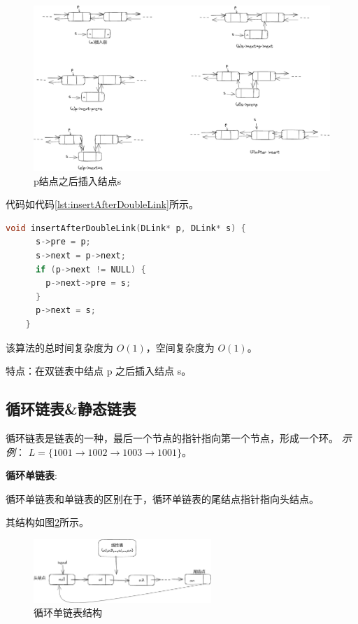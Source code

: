 \documentclass[lang=cn,newtx,10pt,scheme=chinese]{../elegantbook}
\begin{document}
  \begin{figure}[!htbp]
    \centering
    \includegraphics[width=1\textwidth]{./figure/pdf/cropped/insertDL.pdf}
    \caption{p结点之后插入结点s}
    \label{fig:insertAfterDoubleLink}
  \end{figure}
  代码如代码\ref{lst:insertAfterDoubleLink}所示。

  \begin{lstlisting}[language=C++, caption={p结点之后插入结点s示例代码}, label={lst:insertAfterDoubleLink}]
    void insertAfterDoubleLink(DLink* p, DLink* s) {
      s->pre = p;
      s->next = p->next;
      if (p->next != NULL) {
        p->next->pre = s;
      }
      p->next = s;
    }
  \end{lstlisting}

  该算法的总时间复杂度为 $O(1)$，空间复杂度为 $O(1)$。

  特点：在双链表中结点 p 之后插入结点 s。



  \subsection{循环链表\&静态链表}
  循环链表是链表的一种，最后一个节点的指针指向第一个节点，形成一个环。
  \textit{示例}：
  $L = \{1001 \rightarrow 1002 \rightarrow 1003 \rightarrow 1001\}$。

  \textbf{循环单链表}:

  循环单链表和单链表的区别在于，循环单链表的尾结点指针指向头结点。

  其结构如图\ref{fig:cycleSingleLink}所示。

  \begin{figure}[!htbp]
    \centering
    \includegraphics[width=0.6\textwidth]{./figure/pdf/cropped/cycleSLink.pdf}
    \caption{循环单链表结构}
    \label{fig:cycleSingleLink}
  \end{figure}
\end{document}
